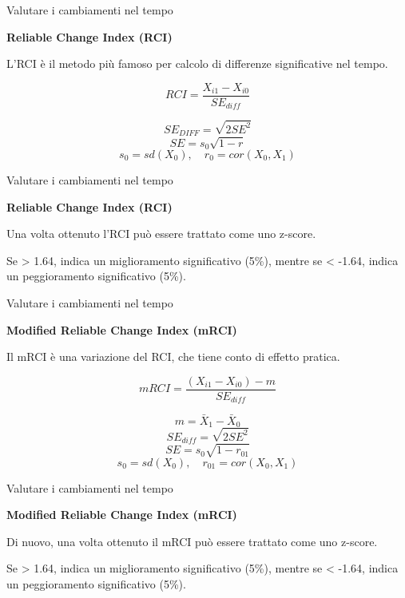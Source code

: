 \documentclass[
  ignorenonframetext,
  aspectratio=169,
]{beamer}
\begin{document}
\begin{frame}{Valutare i cambiamenti nel tempo}
\label{valutare-i-cambiamenti-nel-tempo-9}
\begin{center}
\textbf{Reliable Change Index (RCI)}
\end{center}
\vspace{2em}

L'RCI è il metodo più famoso per calcolo di differenze significative nel
tempo.

\[
  RCI = \frac{X_{i1} -X_{i0}}{SE_{diff}}
\]

\small

\[ SE_{DIFF} = \sqrt{2SE^2} \] \[SE = s_0\sqrt{1-r} \]
\[s_0 = sd(X_0), \quad r_0 = cor(X_0,X_1)\]
\end{frame}

\begin{frame}{Valutare i cambiamenti nel tempo}
\label{valutare-i-cambiamenti-nel-tempo-10}
\begin{center}
\textbf{Reliable Change Index (RCI)}
\end{center}
\vspace{2em}

Una volta ottenuto l'RCI può essere trattato come uno z-score.

Se \textgreater{} 1.64, indica un miglioramento significativo (5\%),
mentre se \textless{} -1.64, indica un peggioramento significativo
(5\%).
\end{frame}

\begin{frame}{Valutare i cambiamenti nel tempo}
\label{valutare-i-cambiamenti-nel-tempo-11}
\begin{center}
\textbf{Modified Reliable Change Index (mRCI)}
\end{center}
\vspace{2em}

Il mRCI è una variazione del RCI, che tiene conto di effetto pratica.

\[
mRCI = \frac{(X_{i1}-X_{i0})-m}{SE_{diff}}
\]

\small

\[m = \bar{X}_1 - \bar{X}_0\] \[SE_{diff} = \sqrt{2SE^2}\]
\[SE = s_0\sqrt{1-r_{01}}\]
\[s_0 = sd(X_0), \quad r_{01} = cor(X_0, X_1)\]
\end{frame}

\begin{frame}{Valutare i cambiamenti nel tempo}
\label{valutare-i-cambiamenti-nel-tempo-12}
\begin{center}
\textbf{Modified Reliable Change Index (mRCI)}
\end{center}
\vspace{2em}

Di nuovo, una volta ottenuto il mRCI può essere trattato come uno
z-score.

Se \textgreater{} 1.64, indica un miglioramento significativo (5\%),
mentre se \textless{} -1.64, indica un peggioramento significativo
(5\%).
\end{frame}
\end{document}
